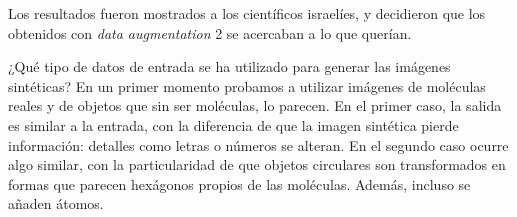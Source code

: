 \begin{figure}[H]
\centering
\end{figure}

Los resultados fueron mostrados a los científicos israelíes, y decidieron que los obtenidos con \textit{data augmentation} 2 se acercaban a lo que querían.

¿Qué tipo de datos de entrada se ha utilizado para generar las imágenes sintéticas? En un primer momento probamos a utilizar imágenes de moléculas reales y de objetos que sin ser moléculas, lo parecen. En el primer caso, la salida es similar a la entrada, con la diferencia de que la imagen sintética pierde información: detalles como letras o números se alteran. En el segundo caso ocurre algo similar, con la particularidad de que objetos circulares son transformados en formas que parecen hexágonos propios de las moléculas. Además, incluso se añaden átomos.

